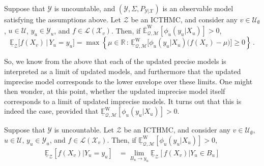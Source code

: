 \documentclass[twoside,11pt]{article}
\newcommand{\reals}{\mathbb{R}}
\newcommand{\states}{\mathcal{X}}
\newcommand{\observs}{\mathcal{Y}}
\newcommand{\lexp}{\underline{\mathbb{E}}_{\rateset,\mathcal{M}}^\mathrm{W}}
\newcommand{\uexp}{\overline{\mathbb{E}}_{\rateset,\mathcal{M}}^\mathrm{W}}
\newcommand{\gambles}{\mathcal{L}}
\newcommand{\rateset}{\mathcal{Q}}
\newcommand{\coloneqq}{:\!=}
\begin{document}
\begin{proposition}\label{prop:GBR_for_densities_lower_zero}
Suppose that $\observs$ is uncountable, and $(\observs,\Sigma,P_{\observs\vert\states})$ is an observable model satisfying the assumptions above. Let $\mathcal{Z}$ be an ICTHMC, and consider any $v\in\mathcal{U}_\emptyset$, $u\in\mathcal{U}$, $y_u\in\observs_u$, and $f\in\gambles(\states_v)$. Then, if $\uexp[\phi_u(y_u\vert X_u)]>0$,
\begin{equation*}
\underline{\mathbb{E}}_{\mathcal{Z}}\bigl[f(X_v)\,\vert\,Y_u = y_u\bigr] = \max\left\{\mu\in\reals\,:\, \lexp\bigl[\phi_u(y_u\vert X_u)\bigl(f(X_v) - \mu\bigr)\bigr] \geq 0\right\}\,.
\end{equation*}
\end{proposition}
%
So, we know from the above that each of the updated precise models is interpreted as a limit of updated models, and furthermore that the updated imprecise model corresponds to the lower envelope over these limits. One might then wonder, at this point, whether the updated imprecise model itself corresponds to a limit of updated imprecise models. It turns out that this is indeed the case, provided that $\lexp[\phi_u(y_u\vert X_u)]>0$.

\begin{proposition}\label{prop:GBR_for_densities_is_limit_if_continuous}
Suppose that $\observs$ is uncountable. Let $\mathcal{Z}$ be an ICTHMC, and consider any $v\in\mathcal{U}_\emptyset$, $u\in\mathcal{U}$, $y_u\in\observs_u$, and $f\in\gambles(\states_v)$. Then, if $\lexp[\phi_u(y_u\vert X_u)]>0$,
\begin{align*}
\underline{\mathbb{E}}_\mathcal{Z}[f(X_v)\vert Y_u=y_u] %
 &= \lim_{B_u\to y_u}\underline{\mathbb{E}}_\mathcal{Z}[f(X_v)\vert Y_u\in B_u]
\end{align*}
\end{proposition}
\end{document}
